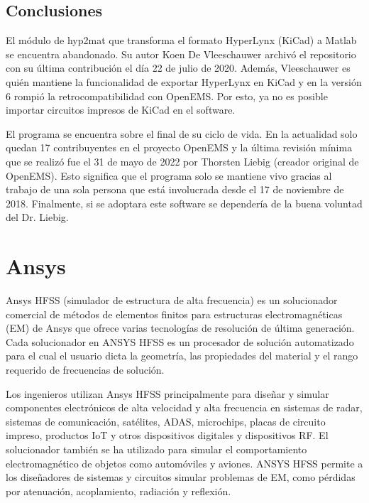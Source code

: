 \documentclass[
    11pt,
    spanish,
    a4paper
]{article}
\begin{document}
\subsection{Conclusiones}

El módulo de hyp2mat que transforma el formato HyperLynx (KiCad) a Matlab se encuentra abandonado.
Su autor Koen De Vleeschauwer archivó el repositorio con su última contribución el día 22 de julio de 2020.
Además, Vleeschauwer es quién mantiene la funcionalidad de exportar HyperLynx en KiCad y en la versión 6 rompió la retrocompatibilidad con OpenEMS.
Por esto, ya no es posible importar circuitos impresos de KiCad en el software.

El programa se encuentra sobre el final de su ciclo de vida.
En la actualidad solo quedan 17 contribuyentes en el proyecto OpenEMS y la última revisión mínima que se realizó fue el 31 de mayo de 2022 por Thorsten Liebig (creador original de OpenEMS).
Esto significa que el programa solo se mantiene vivo gracias al trabajo de una sola persona que está involucrada desde el 17 de noviembre de 2018.
Finalmente, si se adoptara este software se dependería de la buena voluntad del Dr. Liebig.


\newpage


\section{Ansys}

Ansys HFSS (simulador de estructura de alta frecuencia) es un solucionador comercial de métodos de elementos finitos para estructuras electromagnéticas (EM) de Ansys que ofrece varias tecnologías de resolución de última generación.
Cada solucionador en ANSYS HFSS es un procesador de solución automatizado para el cual el usuario dicta la geometría, las propiedades del material y el rango requerido de frecuencias de solución.

Los ingenieros utilizan Ansys HFSS principalmente para diseñar y simular componentes electrónicos de alta velocidad y alta frecuencia en sistemas de radar, sistemas de comunicación, satélites, ADAS, microchips, placas de circuito impreso, productos IoT y otros dispositivos digitales y dispositivos RF.
El solucionador también se ha utilizado para simular el comportamiento electromagnético de objetos como automóviles y aviones.
ANSYS HFSS permite a los diseñadores de sistemas y circuitos simular problemas de EM, como pérdidas por atenuación, acoplamiento, radiación y reflexión.
\end{document}
